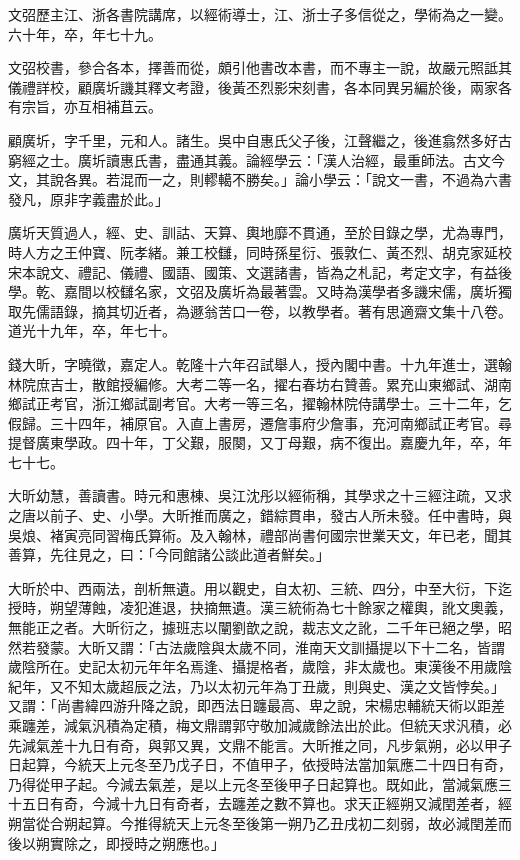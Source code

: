 \begin{pinyinscope}
文弨歷主江、浙各書院講席，以經術導士，江、浙士子多信從之，學術為之一變。六十年，卒，年七十九。

文弨校書，參合各本，擇善而從，頗引他書改本書，而不專主一說，故嚴元照詆其儀禮詳校，顧廣圻譏其釋文考證，後黃丕烈影宋刻書，各本同異另編於後，兩家各有宗旨，亦互相補苴云。

顧廣圻，字千里，元和人。諸生。吳中自惠氏父子後，江聲繼之，後進翕然多好古窮經之士。廣圻讀惠氏書，盡通其義。論經學云：「漢人治經，最重師法。古文今文，其說各異。若混而一之，則轇轕不勝矣。」論小學云：「說文一書，不過為六書發凡，原非字義盡於此。」

廣圻天質過人，經、史、訓詁、天算、輿地靡不貫通，至於目錄之學，尤為專門，時人方之王仲寶、阮孝緒。兼工校讎，同時孫星衍、張敦仁、黃丕烈、胡克家延校宋本說文、禮記、儀禮、國語、國策、文選諸書，皆為之札記，考定文字，有益後學。乾、嘉間以校讎名家，文弨及廣圻為最著雲。又時為漢學者多譏宋儒，廣圻獨取先儒語錄，摘其切近者，為遯翁苦口一卷，以教學者。著有思適齋文集十八卷。道光十九年，卒，年七十。

錢大昕，字曉徵，嘉定人。乾隆十六年召試舉人，授內閣中書。十九年進士，選翰林院庶吉士，散館授編修。大考二等一名，擢右春坊右贊善。累充山東鄉試、湖南鄉試正考官，浙江鄉試副考官。大考一等三名，擢翰林院侍講學士。三十二年，乞假歸。三十四年，補原官。入直上書房，遷詹事府少詹事，充河南鄉試正考官。尋提督廣東學政。四十年，丁父艱，服闋，又丁母艱，病不復出。嘉慶九年，卒，年七十七。

大昕幼慧，善讀書。時元和惠棟、吳江沈彤以經術稱，其學求之十三經注疏，又求之唐以前子、史、小學。大昕推而廣之，錯綜貫串，發古人所未發。任中書時，與吳烺、褚寅亮同習梅氏算術。及入翰林，禮部尚書何國宗世業天文，年已老，聞其善算，先往見之，曰：「今同館諸公談此道者鮮矣。」

大昕於中、西兩法，剖析無遺。用以觀史，自太初、三統、四分，中至大衍，下迄授時，朔望薄蝕，凌犯進退，抉摘無遺。漢三統術為七十餘家之權輿，訛文奧義，無能正之者。大昕衍之，據班志以闡劉歆之說，裁志文之訛，二千年已絕之學，昭然若發蒙。大昕又謂：「古法歲陰與太歲不同，淮南天文訓攝提以下十二名，皆謂歲陰所在。史記太初元年年名焉逢、攝提格者，歲陰，非太歲也。東漢後不用歲陰紀年，又不知太歲超辰之法，乃以太初元年為丁丑歲，則與史、漢之文皆悖矣。」又謂：「尚書緯四游升降之說，即西法日躔最高、卑之說，宋楊忠輔統天術以距差乘躔差，減氣汎積為定積，梅文鼎謂郭守敬加減歲餘法出於此。但統天求汎積，必先減氣差十九日有奇，與郭又異，文鼎不能言。大昕推之同，凡步氣朔，必以甲子日起算，今統天上元冬至乃戊子日，不值甲子，依授時法當加氣應二十四日有奇，乃得從甲子起。今減去氣差，是以上元冬至後甲子日起算也。既如此，當減氣應三十五日有奇，今減十九日有奇者，去躔差之數不算也。求天正經朔又減閏差者，經朔當從合朔起算。今推得統天上元冬至後第一朔乃乙丑戌初二刻弱，故必減閏差而後以朔實除之，即授時之朔應也。」


\end{pinyinscope}
